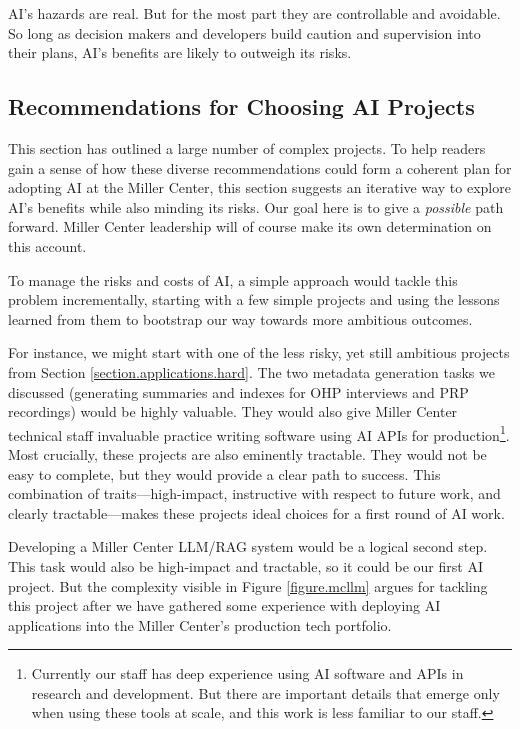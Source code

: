 \documentclass[12pt, oneside]{article}   	%
\begin{document}
AI's hazards are real.  But for the most part they are controllable and avoidable.  So long as decision makers and developers build caution and supervision into their plans, AI's benefits are likely to outweigh its risks.


\subsection{Recommendations for Choosing AI Projects}\label{section.applications.recommendations}
This section has outlined a large number of complex projects.  To help readers gain a sense of how these diverse recommendations could form a coherent plan for adopting AI at the Miller Center, this section suggests an iterative way to explore AI's benefits while also minding its risks.  Our goal here is to give a \emph{possible} path forward.  Miller Center leadership will of course make its own determination on this account.  

To manage the risks and costs of AI, a simple approach would tackle this problem incrementally, starting with a few simple projects and using the lessons learned from them to bootstrap our way towards more ambitious outcomes.

For instance, we might start with one of the less risky, yet still ambitious projects from Section \ref{section.applications.hard}.  The two metadata generation tasks we discussed (generating summaries and indexes for OHP interviews and PRP recordings) would be highly valuable.  They would also give Miller Center technical staff invaluable practice writing software using AI APIs for production\footnote{Currently our staff has deep experience using AI software and APIs in research and development.  But there are important details that emerge only when using these tools at scale, and this work is less familiar to our staff.}.  Most crucially, these projects are also eminently tractable.  They would not be easy to complete, but they would provide a clear path to success.  This combination of traits---high-impact, instructive with respect to future work, and clearly tractable---makes these projects ideal choices for a first round of AI work.

Developing a Miller Center LLM/RAG system would be a logical second step.  This task would also be high-impact and tractable, so it could be our first AI project.  But the complexity visible in Figure \ref{figure.mcllm} argues for tackling this project after we have gathered some experience with deploying AI applications into the Miller Center's production tech portfolio. 
\end{document}
